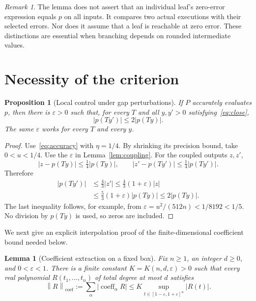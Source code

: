 \documentclass[11pt,a4paper]{article}
\numberwithin{equation}{section}
\newtheorem{lemma}[theorem]{Lemma}
\newtheorem{proposition}[theorem]{Proposition}
\theoremstyle{definition}
\theoremstyle{remark}
\newtheorem{remark}[theorem]{Remark}
\newcommand{\abs}[1]{\left|#1\right|}
\newcommand{\coefnorm}[1]{\left\lVert#1\right\rVert_{\mathrm{coef}}}
\begin{document}
\begin{remark}\label{rem:no-leaf}
The lemma does not assert that an individual leaf's zero-error expression
equals $p$ on all inputs.  It compares two actual executions with their
selected errors.  Nor does it assume that a leaf is reachable at zero
error.  These distinctions are essential when branching depends on
rounded intermediate values.
\end{remark}

\section{Necessity of the criterion}\label{sec:necessity}

\begin{proposition}[Local control under gap perturbations]
\label{prop:local}
If $P$ accurately evaluates $p$, then there is $\varepsilon>0$ such that,
for every $T$ and all $y,y'>0$ satisfying~\eqref{eq:close},
\begin{equation}\label{eq:local}
 \abs{p(Ty')}\le2\abs{p(Ty)}.
\end{equation}
The same $\varepsilon$ works for every $T$ and every $y$.
\end{proposition}

\begin{proof}
Use~\eqref{eq:accuracy} with $\eta=1/4$.  By shrinking its precision
bound, take $0<u<1/4$.  Use the $\varepsilon$ in
Lemma~\ref{lem:coupling}.  For the coupled outputs $z,z'$,
\[
 \abs{z-p(Ty)}\le\tfrac14\abs{p(Ty)},
 \qquad
 \abs{z'-p(Ty')}\le\tfrac14\abs{p(Ty')}.
\]
Therefore
\begin{align*}
 \abs{p(Ty')}
 &\le\tfrac43\abs{z'}
 \le\tfrac43(1+\varepsilon)\abs z\\
 &\le\tfrac53(1+\varepsilon)\abs{p(Ty)}
 \le2\abs{p(Ty)}.
\end{align*}
The last inequality follows, for example, from
$\varepsilon=u^2/(512n)<1/8192<1/5$.
No division by $p(Ty)$ is used, so zeros are included.
\end{proof}

We next give an explicit interpolation proof of the finite-dimensional
coefficient bound needed below.

\begin{lemma}[Coefficient extraction on a fixed box]\label{lem:coefficients}
Fix $n\ge1$, an integer $d\ge0$, and $0<\varepsilon<1$.  There is a
finite constant $K=K(n,d,\varepsilon)>0$ such that every real polynomial
$R(t_1,\ldots,t_n)$ of total degree at most $d$ satisfies
\begin{equation}\label{eq:coefbound}
 \coefnorm R
 :=\sum_\alpha\abs{\operatorname{coeff}_\alpha R}
 \le K\sup_{t\in[1-\varepsilon,1+\varepsilon]^n}\abs{R(t)}.
\end{equation}
\end{lemma}
\end{document}
